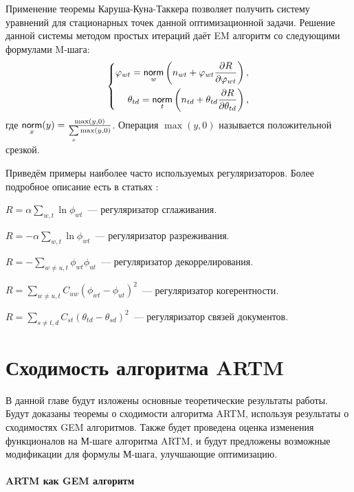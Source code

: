 \documentclass[12pt, twoside]{article}
\begin{document}
Применение теоремы Каруша-Куна-Таккера позволяет получить систему уравнений для стационарных точек данной оптимизационной задачи. Решение данной системы методом простых итераций даёт EM алгоритм со следующими формулами M-шага:
\[
\left\{
	\begin{aligned}
\varphi_{wt} = \mathop{\mathsf{norm}}\limits_w  \left(n_{wt} + \varphi_{wt}\frac{\partial R}{\partial\varphi_{wt}}\right),\\
\theta_{td} = \mathop{\mathsf{norm}}\limits_t  \left(n_{td} + \theta_{td}\frac{\partial R}{\partial\theta_{td}}\right),
	\end{aligned}
\right.
\]
где $\norm_x(y) = \frac{\max(y, 0)}{\sum\limits_x \max(y, 0)}$. Операция $\max(y, 0)$ называется положительной срезкой.

Приведём примеры наиболее часто используемых регуляризаторов. Более подробное описание есть в статьях \cite{vorontsov2014additive, vorontsov2014tutorial, vorontsov2015additive}:
\begin{enumerate*}
\item $R = \alpha \sum\limits_{w, t} \ln \phi_{wt}$~--- регуляризатор сглаживания.
\item $R = -\alpha \sum\limits_{w, t} \ln \phi_{wt}$~--- регуляризатор разреживания.
\item $R = -\sum\limits_{w \neq u, t} \phi_{wt} \phi_{ut}$~--- регуляризатор декоррелирования.
\item $R = \sum\limits_{w \neq u, t} C_{uw}\left( \phi_{wt}  - \phi_{ut} \right)^2$~--- регуляризатор когерентности.
\item $R = \sum\limits_{s \neq t, d} C_{st}\left( \theta_{td}  - \theta_{sd} \right)^2$~--- регуляризатор связей документов.
\end{enumerate*}

\section{Сходимость алгоритма ARTM}

В данной главе будут изложены основные теоретические результаты работы. Будут доказаны теоремы о сходимости алгоритма ARTM, используя результаты о сходимостях GEM алгоритмов. Также будет проведена оценка изменения функционалов на М-шаге алгоритма ARTM, и будут предложены возможные модификации для формулы М-шага, улучшающие оптимизацию. 
	
\paragraph{ARTM как GEM алгоритм}
\label{subsec:artmasgem}
\end{document}
